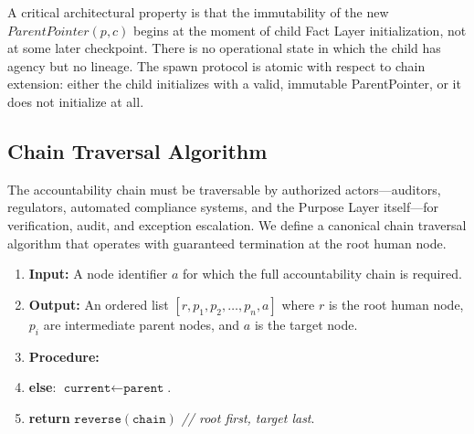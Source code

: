 A critical architectural property is that the immutability of the new $\textit{ParentPointer}(p, c)$ begins at the moment of child Fact Layer initialization, not at some later checkpoint. There is no operational state in which the child has agency but no lineage. The spawn protocol is atomic with respect to chain extension: either the child initializes with a valid, immutable ParentPointer, or it does not initialize at all.

\subsection{Chain Traversal Algorithm}

The accountability chain must be traversable by authorized actors—auditors, regulators, automated compliance systems, and the Purpose Layer itself—for verification, audit, and exception escalation. We define a canonical chain traversal algorithm that operates with guaranteed termination at the root human node.

\begin{algorithm}[htbp]
\caption{Accountability Chain Traversal}
\label{alg:chain-traversal}
\begin{enumerate}[noitemsep]
    \item \textbf{Input:} A node identifier $a$ for which the full accountability chain is required.
    \item \textbf{Output:} An ordered list $[r, p_1, p_2, \dots, p_n, a]$ where $r$ is the root human node, $p_i$ are intermediate parent nodes, and $a$ is the target node.
    \item \textbf{Procedure:}
            \item \textbf{else}: $\texttt{current} \gets \texttt{parent}$.
        \endenumerate
        \item \textbf{return} $\texttt{reverse}(\texttt{chain})$ \hfill \textit{// root first, target last}.
    \endenumerate
\end{enumerate}
\end{algorithm}

